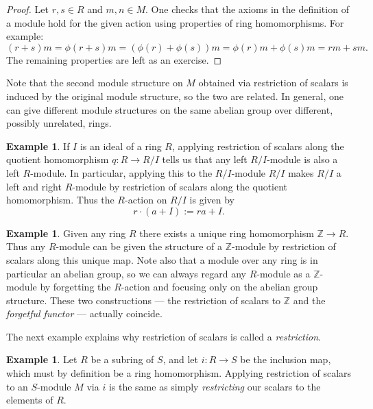 \documentclass[12pt]{report}
\numberwithin{equation}{section}
\numberwithin{theorem}{chapter}
\theoremstyle{definition}
\newtheorem{example}[theorem]{Example}
\newtheorem*{basic properties}{Basic Properties}
\newtheorem*{Important Remark}{Important Remark}
\begin{document}
\begin{proof}
  Let $r,s \in R$ and $m,n \in M$. One checks that the axioms in the definition of a module hold for the given action using properties of ring homomorphisms. For example:
$$(r+s)m=\phi(r + s)m= (\phi(r)+\phi(s))m=\phi(r)m + \phi(s)m=rm+sm.$$
The remaining properties are left as an exercise.
\end{proof}

Note that the second module structure on $M$ obtained via restriction of scalars is induced by the original module structure, so the two are related. In general, one can give different module structures on the same abelian group over different, possibly unrelated, rings.

\begin{example}
If $I$ is an ideal of a ring $R$, applying restriction of scalars along the quotient homomorphism $q\!:R\to R/I$ tells us that any left $R/I$-module is also a left $R$-module. In particular, applying this to the $R/I$-module $R/I$ makes $R/I$ a left and right $R$-module by restriction of scalars along the quotient homomorphism. Thus the $R$-action on $R/I$ is given by
$$r \cdot (a + I) := ra + I.$$
\end{example}

\begin{example}
Given any ring $R$ there exists a unique ring homomorphism $\mathbb{Z} \to R$. Thus any $R$-module can be given the structure of a $\mathbb{Z}$-module by restriction of scalars along this unique map. Note also that a module over any ring is in particular an abelian group, so we can always regard any $R$-module as a $\mathbb{Z}$-module by forgetting the $R$-action and focusing only on the abelian group structure. These two constructions --- the restriction of scalars to $\mathbb{Z}$ and the \emph{forgetful functor} --- actually coincide.
\end{example}

The next example explains why restriction of scalars is called a \emph{restriction}.

\begin{example}
	Let $R$ be a subring of $S$, and let $i\!: R \to S$ be the inclusion map, which must by definition be a ring homomorphism. Applying restriction of scalars to an $S$-module $M$ via $i$ is the same as simply \emph{restricting} our scalars to the elements of $R$.
\end{example}
\end{document}
